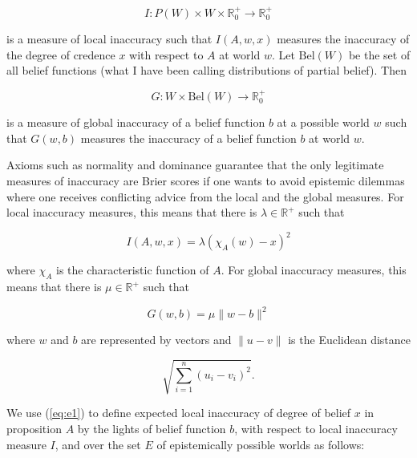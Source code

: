 \documentclass[11pt]{article}
\begin{document}
\begin{equation}
  \label{eq:linacc}
  I:P(W)\times{}W\times{}\mathbb{R}^{+}_{0}\rightarrow\mathbb{R}^{+}_{0}
\end{equation}

{\noindent}is a measure of local inaccuracy such that $I(A,w,x)$
measures the inaccuracy of the degree of credence $x$ with respect to
$A$ at world $w$. Let $\mbox{Bel}(W)$ be the set of all belief
functions (what I have been calling distributions of partial belief).
Then

\begin{equation}
  \label{eq:ginacc}
  G:W\times\mbox{Bel}(W)\rightarrow\mathbb{R}^{+}_{0}
\end{equation}

{\noindent}is a measure of global inaccuracy of a belief function $b$
at a possible world $w$ such that $G(w,b)$ measures the inaccuracy of
a belief function $b$ at world $w$.

Axioms such as normality and dominance guarantee that the only
legitimate measures of inaccuracy are Brier scores if one wants to
avoid epistemic dilemmas where one receives conflicting advice from
the local and the global measures. For local inaccuracy measures, this
means that there is $\lambda\in\mathbb{R}^{+}$ such that

\begin{equation}
  \label{eq:e1}
  I(A,w,x)=\lambda\left(\chi_{A}(w)-x\right)^{2}
\end{equation}

where $\chi_{A}$ is the characteristic function of $A$. For global
inaccuracy measures, this means that there is $\mu\in\mathbb{R}^{+}$
such that

\begin{equation}
  \label{eq:e2}
  G(w,b)=\mu\|w-b\|^{2}
\end{equation}

where $w$ and $b$ are represented by vectors and $\|u-v\|$ is the
Euclidean distance

\begin{equation}
  \label{eq:e3}
  \sqrt{\sum_{i=1}^{n}\left(u_{i}-v_{i}\right)^{2}}.
\end{equation}

We use (\ref{eq:e1}) to define expected local inaccuracy of degree of
belief $x$ in proposition $A$ by the lights of belief function $b$,
with respect to local inaccuracy measure $I$, and over the set $E$ of
epistemically possible worlds as follows:
\end{document}
